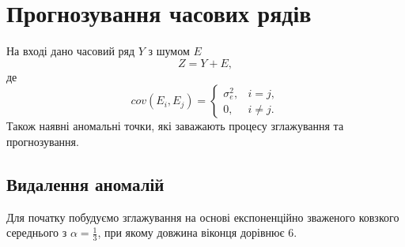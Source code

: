 \chapter{Прогнозування часових рядів}

На вході дано часовий ряд $Y$ з шумом $E$
\begin{equation*}
  Z = Y + E,
\end{equation*}
де
\begin{equation*}
  cov(E_i, E_j) =
    \begin{cases}
      \sigma_e^2,& i = j, \\
      0,&          i \neq j.
    \end{cases}
\end{equation*}
Також наявні аномальні точки,
які заважають процесу зглажування та прогнозування.

\section{Видалення аномалій}

Для початку побудуємо зглажування на основі експоненційно зваженого
ковзкого середнього з $\alpha = \frac{1}{3}$,
при якому довжина віконця дорівнює $6$.
\begin{center}
\end{center}

